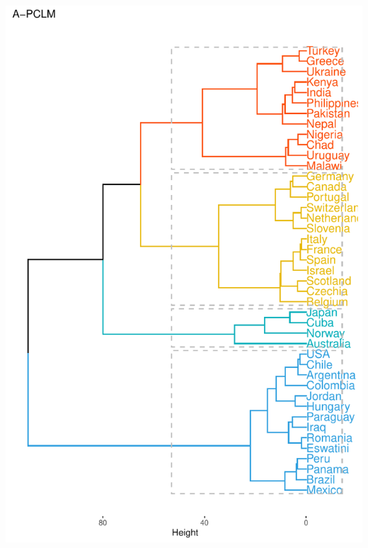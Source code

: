 \documentclass[table,xcdraw,dvipsnames]{beamer}
\begin{document}
\begin{frame}[fragile]
{\begin{columns}
		\begin{column}{5cm}
			\includegraphics[scale=.35]{Figures/HierDendo.pdf}
		\end{column}
	\end{columns}
}
\end{frame}
\end{document}
